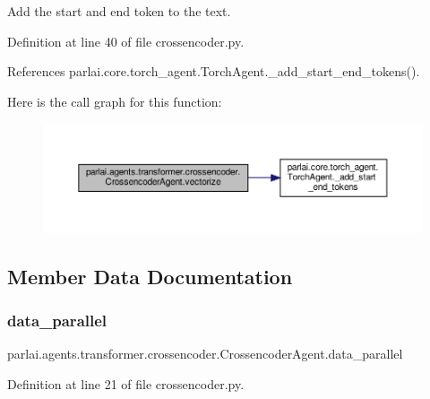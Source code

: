 \begin{DoxyVerb}Add the start and end token to the text.
\end{DoxyVerb}
 

Definition at line 40 of file crossencoder.\+py.



References parlai.\+core.\+torch\+\_\+agent.\+Torch\+Agent.\+\_\+add\+\_\+start\+\_\+end\+\_\+tokens().

Here is the call graph for this function\+:
\nopagebreak
\begin{figure}[H]
\begin{center}
\leavevmode
\includegraphics[width=350pt]{classparlai_1_1agents_1_1transformer_1_1crossencoder_1_1CrossencoderAgent_a736057f000f0d4cdb5d006e10c4291db_cgraph}
\end{center}
\end{figure}


\subsection{Member Data Documentation}
\mbox{\label{classparlai_1_1agents_1_1transformer_1_1crossencoder_1_1CrossencoderAgent_a991c76bbbb234ba482e3eaf3b6813bc8}} 
\subsubsection{\texorpdfstring{data\+\_\+parallel}{data\_parallel}}
{\footnotesize\ttfamily parlai.\+agents.\+transformer.\+crossencoder.\+Crossencoder\+Agent.\+data\+\_\+parallel}



Definition at line 21 of file crossencoder.\+py.

